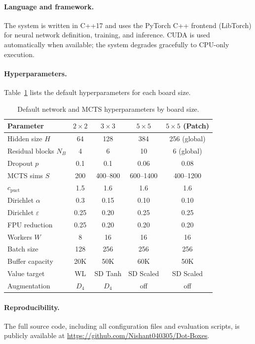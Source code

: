 \documentclass[11pt]{article}
\begin{document}
\paragraph{Language and framework.}
The system is written in C++17 and uses the PyTorch C++ frontend
(LibTorch) for neural network definition, training, and inference.
CUDA is used automatically when available; the system degrades
gracefully to CPU-only execution.

\paragraph{Hyperparameters.}
Table~\ref{tab:hyperparams} lists the default hyperparameters for each
board size.

\begin{table}[t]
\centering
\caption{Default network and MCTS hyperparameters by board size.}
\label{tab:hyperparams}
\begin{tabular}{lcccc}
\toprule
Parameter & $2{\times}2$ & $3{\times}3$ & $5{\times}5$ & $5{\times}5$ (Patch) \\
\midrule
Hidden size $H$ & 64 & 128 & 384 & 256 (global) \\
Residual blocks $N_B$ & 4 & 6 & 10 & 6 (global) \\
Dropout $p$ & 0.1 & 0.1 & 0.06 & 0.08 \\
MCTS sims $S$ & 200 & 400--800 & 600--1400 & 400--1200 \\
$c_{\text{puct}}$ & 1.5 & 1.6 & 1.6 & 1.6 \\
Dirichlet $\alpha$ & 0.3 & 0.15 & 0.10 & 0.10 \\
Dirichlet $\varepsilon$ & 0.25 & 0.20 & 0.25 & 0.25 \\
FPU reduction & 0.25 & 0.20 & 0.20 & 0.20 \\
Workers $W$ & 8 & 16 & 16 & 16 \\
Batch size & 128 & 256 & 256 & 256 \\
Buffer capacity & 20K & 50K & 60K & 50K \\
Value target & WL & SD Tanh & SD Scaled & SD Scaled \\
Augmentation & $D_4$ & $D_4$ & off & off \\
\bottomrule
\end{tabular}
\end{table}

\paragraph{Reproducibility.}
The full source code, including all configuration files and evaluation
scripts, is publicly available at
\url{https://github.com/Nishant040305/Dot-Boxes}.
\end{document}
